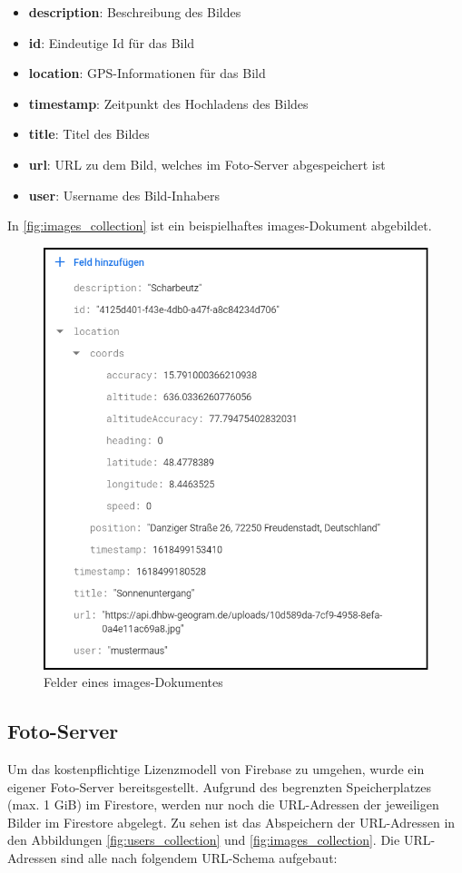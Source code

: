 \begin{itemize}
    \item \textbf{description}: Beschreibung des Bildes
    \item \textbf{id}: Eindeutige Id für das Bild
    \item \textbf{location}: GPS-Informationen für das Bild
    \item \textbf{timestamp}: Zeitpunkt des Hochladens des Bildes
    \item \textbf{title}: Titel des Bildes
    \item \textbf{url}: URL zu dem Bild, welches im Foto-Server abgespeichert ist
    \item \textbf{user}: Username des Bild-Inhabers
\end{itemize}

In \autoref{fig:images_collection} ist ein beispielhaftes images-Dokument abgebildet.

\begin{figure}[H]
    \centering
    \includegraphics[width=.7\linewidth]{images/collection_images.png}
    \caption{Felder eines \glqq images\grqq{}-Dokumentes}
    \label{fig:images_collection}
\end{figure}

\subsection{Foto-Server\label{sup3.2.3:Unterpunkt-3}}

Um das kostenpflichtige Lizenzmodell von Firebase zu umgehen, wurde ein eigener Foto-Server bereitsgestellt. Aufgrund des begrenzten Speicherplatzes (max. 1 GiB) im Firestore, werden nur noch die URL-Adressen der jeweiligen Bilder im Firestore abgelegt. Zu sehen ist das Abspeichern der URL-Adressen in den Abbildungen \autoref{fig:users_collection} und \autoref{fig:images_collection}. Die URL-Adressen sind alle nach folgendem URL-Schema aufgebaut:

